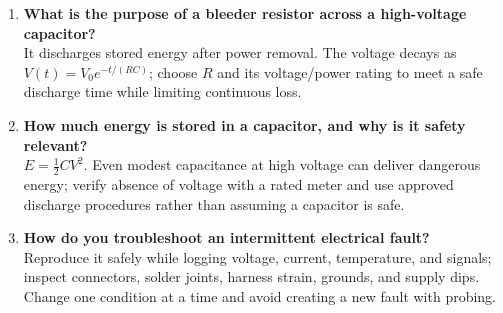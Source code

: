 \documentclass[11pt]{article}
\begin{document}
\begin{enumerate}
\item \textbf{What is the purpose of a bleeder resistor across a high-voltage capacitor?}\\
It discharges stored energy after power removal. The voltage decays as $V(t)=V_0e^{-t/(RC)}$; choose $R$ and its voltage/power rating to meet a safe discharge time while limiting continuous loss.

\item \textbf{How much energy is stored in a capacitor, and why is it safety relevant?}\\
$E=\tfrac12CV^2$. Even modest capacitance at high voltage can deliver dangerous energy; verify absence of voltage with a rated meter and use approved discharge procedures rather than assuming a capacitor is safe.

\item \textbf{How do you troubleshoot an intermittent electrical fault?}\\
Reproduce it safely while logging voltage, current, temperature, and signals; inspect connectors, solder joints, harness strain, grounds, and supply dips. Change one condition at a time and avoid creating a new fault with probing.
\end{enumerate}
\end{document}
